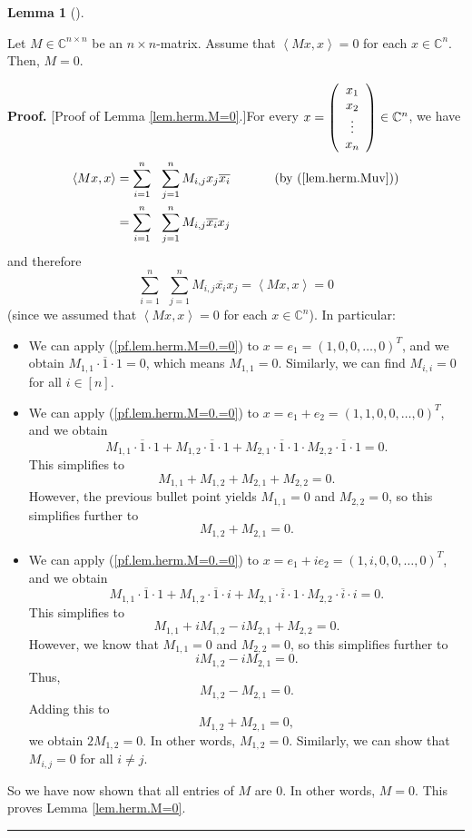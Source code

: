 \documentclass[numbers=enddot,12pt,final,onecolumn,notitlepage]{scrartcl}%
\numberwithin{exer}{subsection}
\theoremstyle{definition}
\newtheorem{lem}[theo]{Lemma}
\newenvironment{lemma}[1][]
{\begin{lem}[#1]\begin{leftbar}}
{\end{leftbar}\end{lem}}
\newenvironment{proof}[1][Proof]{\noindent\textbf{#1.} }{\ \rule{0.5em}{0.5em}}
\let\sumnonlimits\sum
\renewcommand{\sum}{\sumnonlimits\limits}
\begin{document}
\begin{lemma}
\label{lem.herm.M=0}Let $M\in\mathbb{C}^{n\times n}$ be an $n\times n$-matrix.
Assume that $\left\langle Mx,x\right\rangle =0$ for each $x\in\mathbb{C}^{n}$.
Then, $M=0$.
\end{lemma}

\begin{proof}
[Proof of Lemma \ref{lem.herm.M=0}.]For every $x=\left(
\begin{array}
[c]{c}%
x_{1}\\
x_{2}\\
\vdots\\
x_{n}%
\end{array}
\right)  \in\mathbb{C}^{n}$, we have%
\begin{align*}
\left\langle Mx,x\right\rangle  &  =\sum_{i=1}^{n}\ \ \sum_{j=1}^{n}%
M_{i,j}x_{j}\overline{x_{i}}\ \ \ \ \ \ \ \ \ \ \left(  \text{by
(\ref{lem.herm.Muv})}\right) \\
&  =\sum_{i=1}^{n}\ \ \sum_{j=1}^{n}M_{i,j}\overline{x_{i}}x_{j}%
\end{align*}
and therefore%
\begin{equation}
\sum_{i=1}^{n}\ \ \sum_{j=1}^{n}M_{i,j}\overline{x_{i}}x_{j}=\left\langle
Mx,x\right\rangle =0 \label{pf.lem.herm.M=0.=0}%
\end{equation}
(since we assumed that $\left\langle Mx,x\right\rangle =0$ for each
$x\in\mathbb{C}^{n}$). In particular:

\begin{itemize}
\item We can apply (\ref{pf.lem.herm.M=0.=0}) to $x=e_{1}=\left(
1,0,0,\ldots,0\right)  ^{T}$, and we obtain $M_{1,1}\cdot\overline{1}\cdot
1=0$, which means $M_{1,1}=0$. Similarly, we can find $M_{i,i}=0$ for all
$i\in\left[  n\right]  $.

\item We can apply (\ref{pf.lem.herm.M=0.=0}) to $x=e_{1}+e_{2}=\left(
1,1,0,0,\ldots,0\right)  ^{T}$, and we obtain
\[
M_{1,1}\cdot\overline{1}\cdot1+M_{1,2}\cdot\overline{1}\cdot1+M_{2,1}%
\cdot\overline{1}\cdot1\cdot M_{2,2}\cdot\overline{1}\cdot1=0.
\]
This simplifies to%
\[
M_{1,1}+M_{1,2}+M_{2,1}+M_{2,2}=0.
\]
However, the previous bullet point yields $M_{1,1}=0$ and $M_{2,2}=0$, so this
simplifies further to%
\[
M_{1,2}+M_{2,1}=0.
\]


\item We can apply (\ref{pf.lem.herm.M=0.=0}) to $x=e_{1}+ie_{2}=\left(
1,i,0,0,\ldots,0\right)  ^{T}$, and we obtain
\[
M_{1,1}\cdot\overline{1}\cdot1+M_{1,2}\cdot\overline{1}\cdot i+M_{2,1}%
\cdot\overline{i}\cdot1\cdot M_{2,2}\cdot\overline{i}\cdot i=0.
\]
This simplifies to%
\[
M_{1,1}+iM_{1,2}-iM_{2,1}+M_{2,2}=0.
\]
However, we know that $M_{1,1}=0$ and $M_{2,2}=0$, so this simplifies further
to%
\[
iM_{1,2}-iM_{2,1}=0.
\]
Thus,
\[
M_{1,2}-M_{2,1}=0.
\]
Adding this to%
\[
M_{1,2}+M_{2,1}=0,
\]
we obtain $2M_{1,2}=0$. In other words, $M_{1,2}=0$. Similarly, we can show
that $M_{i,j}=0$ for all $i\neq j$.
\end{itemize}

So we have now shown that all entries of $M$ are $0$. In other words, $M=0$.
This proves Lemma \ref{lem.herm.M=0}.
\end{proof}
\end{document}
